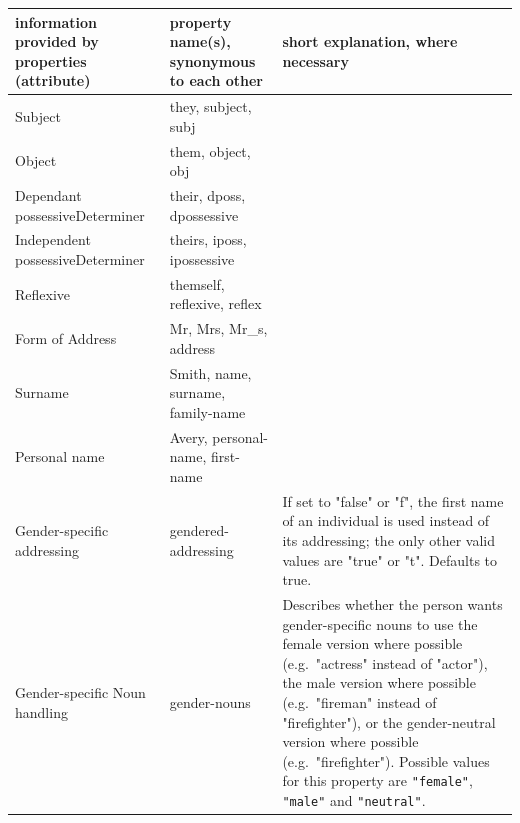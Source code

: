 \documentclass{article}
\begin{document}
    \begin{flushleft}
        \begin{center}
            \begin{longtable}{|>{\raggedright\arraybackslash}p{7em} | >{\raggedright\arraybackslash}p{9em} | >{\raggedright\arraybackslash}p{14em} |}
                 \hline
                 information provided by properties (attribute) & property name(s), \linebreak synonymous to each other & short explanation, where necessary\\
                 \hline\hline
                 Subject & they, subject, subj & \\
                 \hline
                 Object & them, object, obj & \\
                 \hline
                 Dependant possessive\linebreak Determiner & their, dposs, dpossessive & \\
                 \hline
                 Independent possessive\linebreak Determiner & theirs, iposs, ipossessive & \\
                 \hline
                 Reflexive & themself, reflexive, reflex & \\
                 \hline
                 \hline
                 Form of Address & Mr, Mrs, Mr\_s, address & \\
                 \hline
                 Surname & Smith, name, surname, family-name & \\
                 \hline
                 Personal name & Avery, personal-name, first-name & \\
                 \hline
                 \hline
                 Gender-specific addressing & gendered-addressing & If set to "false" or "f", the first name of an individual is used instead of its addressing;
                 the only other valid values are "true" or "t".
                 Defaults to true.\\
                 \hline
                 Gender-specific Noun handling & gender-nouns & Describes whether the person wants gender-specific nouns to use the female version where possible (e.g.\ "actress" instead of "actor"), the male version where possible (e.g.\ "fireman" instead of "firefighter"), or the gender-neutral version where possible (e.g.\ "firefighter").
                 Possible values for this property are \texttt{"female"}, \texttt{"male"} and \texttt{"neutral"}.

\end{longtable}
\end{center}
\end{flushleft}
\end{document}
